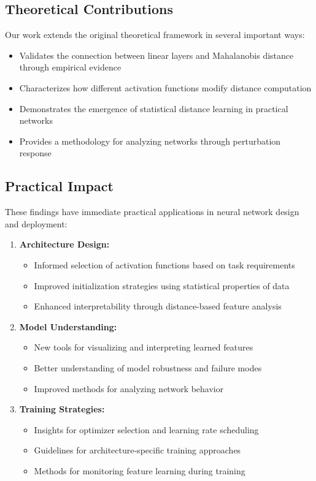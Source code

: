 \subsection{Theoretical Contributions}

Our work extends the original theoretical framework in several important ways:

\begin{itemize}
    \item Validates the connection between linear layers and Mahalanobis distance through empirical evidence
    \item Characterizes how different activation functions modify distance computation
    \item Demonstrates the emergence of statistical distance learning in practical networks
    \item Provides a methodology for analyzing networks through perturbation response
\end{itemize}

\subsection{Practical Impact}

These findings have immediate practical applications in neural network design and deployment:

\begin{enumerate}
    \item \textbf{Architecture Design:}
    \begin{itemize}
        \item Informed selection of activation functions based on task requirements
        \item Improved initialization strategies using statistical properties of data
        \item Enhanced interpretability through distance-based feature analysis
    \end{itemize}

    \item \textbf{Model Understanding:}
    \begin{itemize}
        \item New tools for visualizing and interpreting learned features
        \item Better understanding of model robustness and failure modes
        \item Improved methods for analyzing network behavior
    \end{itemize}

    \item \textbf{Training Strategies:}
    \begin{itemize}
        \item Insights for optimizer selection and learning rate scheduling
        \item Guidelines for architecture-specific training approaches
        \item Methods for monitoring feature learning during training
    \end{itemize}
\end{enumerate}

